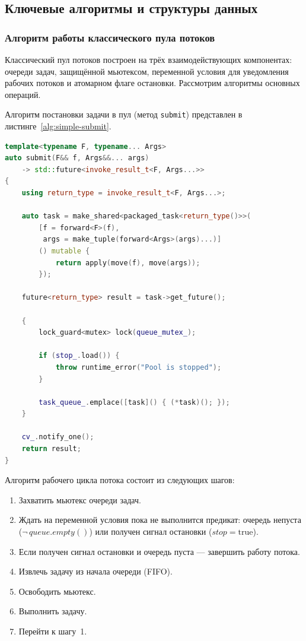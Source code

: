 \subsection{Ключевые алгоритмы и структуры данных}

\subsubsection{Алгоритм работы классического пула потоков}

Классический пул потоков построен на трёх взаимодействующих
компонентах: очереди задач, защищённой мьютексом, переменной
условия для уведомления рабочих потоков и атомарном флаге
остановки. Рассмотрим алгоритмы основных операций.

Алгоритм постановки задачи в пул (метод \texttt{submit})
представлен в листинге~\ref{alg:simple-submit}.

\begin{lstlisting}[language=C++,
                   caption={Алгоритм постановки задачи
                            в SimpleThreadPool},
                   label={alg:simple-submit}]
template<typename F, typename... Args>
auto submit(F&& f, Args&&... args)
    -> std::future<invoke_result_t<F, Args...>>
{
    using return_type = invoke_result_t<F, Args...>;

    auto task = make_shared<packaged_task<return_type()>>(
        [f = forward<F>(f),
         args = make_tuple(forward<Args>(args)...)]
        () mutable {
            return apply(move(f), move(args));
        });

    future<return_type> result = task->get_future();

    {
        lock_guard<mutex> lock(queue_mutex_);

        if (stop_.load()) {
            throw runtime_error("Pool is stopped");
        }

        task_queue_.emplace([task]() { (*task)(); });
    }

    cv_.notify_one();
    return result;
}
\end{lstlisting}

Алгоритм рабочего цикла потока состоит из следующих шагов:

\begin{enumerate}
    \item Захватить мьютекс очереди задач.
    \item Ждать на переменной условия пока не выполнится
          предикат: очередь непуста
          ($\neg\,queue.empty()$) или получен сигнал
          остановки ($stop = \text{true}$).
    \item Если получен сигнал остановки и очередь пуста ---
          завершить работу потока.
    \item Извлечь задачу из начала очереди (FIFO).
    \item Освободить мьютекс.
    \item Выполнить задачу.
    \item Перейти к шагу~1.
\end{enumerate}

